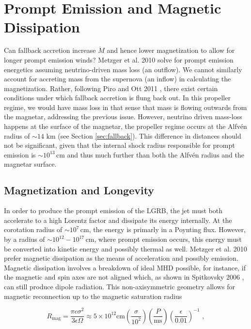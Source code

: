 \documentclass{article}
\begin{document}
\section{Prompt Emission and Magnetic Dissipation} \label{sec:prompt}
Can fallback accretion increase $\dot{M}$ and hence lower magnetization to allow for longer prompt emission winds?  Metzger et al. 2010 \cite{Metzger:2010pp} solve for prompt emission energetics assuming neutrino-driven mass loss (an outflow). We cannot similarly account for accreting mass from the supernova (an inflow) in calculating the magnetization. Rather, following Piro and Ott 2011 \cite {Piro:2011ed}, there exist certain conditions under which fallback accretion is flung back out. In this propeller regime, we would have mass loss in that sense that mass is flowing outwards from the magnetar, addressing the previous issue. However, neutrino driven mass-loss happens at the surface of the magnetar, the propeller regime occurs at the Alfv\'en radius of $\sim 14$ km (see Section \ref{sec:fallback}). This difference in distances should not be significant, given that the internal shock radius responsible for prompt emission is $\sim 10^{13}\,\mathrm{cm}$ and thus much further than both the Alfv\'en radius and the magnetar surface.

\subsection{Magnetization and Longevity}

In order to produce the prompt emission of the LGRB, the jet must both accelerate to a high Lorentz factor and dissipate its energy internally. At the corotation radius of $\sim 10^7$\,cm, the energy is primarly in a Poynting flux. However, by a radius of $\sim 10^{12}- 10^{17}$\,cm, where prompt emission occurs, this energy must be converted into kinetic energy and possibly thermal as well.  Metzger et al. \cite{Metzger:2010pp} 2010 prefer magnetic dissipation as the means of acceleration and possibly emission. Magnetic dissipation involves a breakdown of ideal MHD possible, for instance, if the magnetic and spin axes are not aligned which, as shown in Spitkovsky 2006 \cite{Spitkovsky:2006np}, can still produce dipole radiation. This non-axisymmetric geometry allows for magnetic reconnection up to the magnetic saturation radius

\begin{equation}
  R_{\mathrm{mag}}=\frac{\pi c \sigma^2}{3 \epsilon \Omega}\approx 5 \times 10^{12} \mathrm{cm} (\frac{\sigma}{10^2}) (\frac{P}{\mathrm{ms}})(\frac{\epsilon}{0.01})^{-1}\,\,,
\end{equation}
\end{document}
